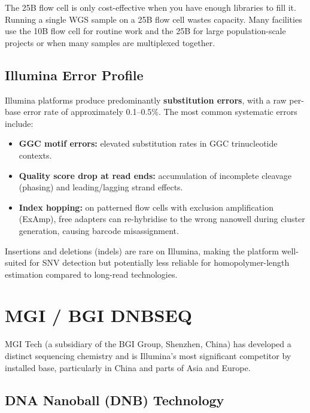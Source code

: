 \begin{tipbox}[title={Choosing an Illumina Flow Cell}]
The 25B flow cell is only cost-effective when you have enough libraries to fill it. Running a single \gls{WGS} sample on a 25B flow cell wastes capacity. Many facilities use the 10B flow cell for routine work and the 25B for large population-scale projects or when many samples are multiplexed together.
\end{tipbox}

\subsection{Illumina Error Profile}

Illumina platforms produce predominantly \textbf{substitution errors}, with a raw per-base error rate of approximately 0.1--0.5\%. The most common systematic errors include:

\begin{itemize}[nosep]
  \item \textbf{GGC motif errors:} elevated substitution rates in GGC trinucleotide contexts.
  \item \textbf{Quality score drop at read ends:} accumulation of incomplete cleavage (phasing) and leading/lagging strand effects.
  \item \textbf{Index hopping:} on patterned flow cells with exclusion amplification (ExAmp), free adapters can re-hybridise to the wrong nanowell during cluster generation, causing barcode misassignment.
\end{itemize}

Insertions and deletions (indels) are rare on Illumina, making the platform well-suited for \gls{SNV} detection but potentially less reliable for homopolymer-length estimation compared to long-read technologies.


\section{MGI / BGI DNBSEQ}
\label{sec:mgi}

MGI Tech (a subsidiary of the BGI Group, Shenzhen, China) has developed a distinct sequencing chemistry and is Illumina's most significant competitor by installed base, particularly in China and parts of Asia and Europe.

\subsection{DNA Nanoball (DNB) Technology}

